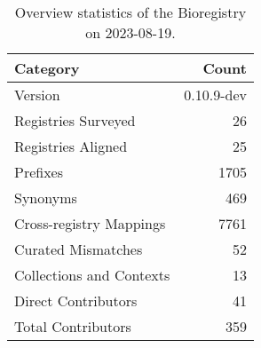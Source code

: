 \begin{table}
\caption{Overview statistics of the Bioregistry on 2023-08-19.}
\label{tab:bioregistry-summary}
\begin{tabular}{lr}
\toprule
Category & Count \\
\midrule
Version & 0.10.9-dev \\
Registries Surveyed & 26 \\
Registries Aligned & 25 \\
Prefixes & 1705 \\
Synonyms & 469 \\
Cross-registry Mappings & 7761 \\
Curated Mismatches & 52 \\
Collections and Contexts & 13 \\
Direct Contributors & 41 \\
Total Contributors & 359 \\
\bottomrule
\end{tabular}
\end{table}
